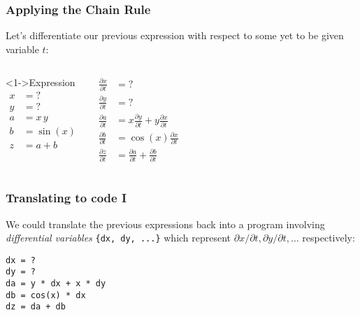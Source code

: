 \documentclass[\beamerclass]{beamer}
\begin{document}
\begin{frame}
\frametitle{Applying the Chain Rule}

Let's differentiate our previous expression with respect to some yet to be given variable $t$:
\begin{columns}
\begin{block}<1->{Expression}
    \vspace{-1.5em}
    \begin{align*}
			x & = ? \\
			y & = ? \\
			a & = x \, y \\
			b & = \sin(x) \\
			z & = a + b
		\end{align*}
    \end{block}

\begin{align*}
	\frac{\partial x}{\partial t} & = ? \\
	\frac{\partial y}{\partial t} & = ? \\
	\frac{\partial a}{\partial t} & = x \frac{\partial y}{\partial t} + y \frac{\partial x}{\partial t}\\
	\frac{\partial b}{\partial t} & = \cos(x) \frac{\partial x}{\partial t}\\
	\frac{\partial z}{\partial t} & = \frac{\partial a}{\partial t} + \frac{\partial b}{\partial t}
\end{align*}
\end{columns}
\vfill
 

\end{frame}

\begin{frame}[fragile]
\frametitle{Translating to code I}
We could translate the previous expressions back into a program involving \emph{differential variables} \lstinline!{dx, dy, ...}! which represent $\partial x/\partial t, \partial y/\partial t, \dots$ respectively:

\begin{lstlisting}
dx = ?
dy = ?
da = y * dx + x * dy
db = cos(x) * dx
dz = da + db	
\end{lstlisting}

\end{frame}
\end{document}
